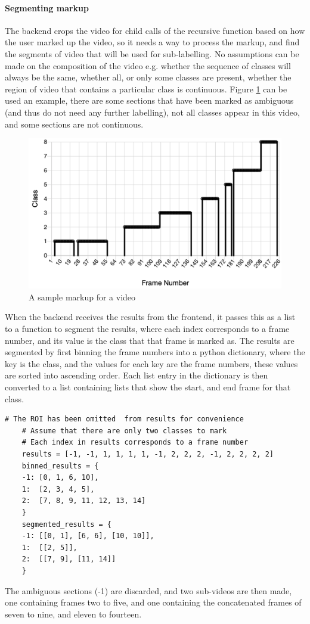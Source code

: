     \paragraph{Segmenting markup}
    The backend crops the video for child calls of the recursive function based on how the user marked up the video, so it needs a way to process the markup, and find the segments of video that will be used for sub-labelling. No assumptions can be made on the composition of the video e.g. whether the sequence of classes will always be the same, whether all, or only some classes are present, whether the region of video that contains a particular class is continuous. Figure \ref{fig:labelsample} can be used an example, there are some sections that have been marked as ambiguous (and thus do not need any further labelling), not all classes appear in this video, and some sections are not continuous.

    \begin{figure}[h]
        \centering
        \includegraphics[width=450px]{../img/sample_label.png}
        \caption{A sample markup for a video}
        \label{fig:labelsample}
    \end{figure}

    When the backend receives the results from the frontend, it passes this as a list to a function to segment the results, where each index corresponds to a frame number, and its value is the class that that frame is marked as. The results are segmented by first binning the frame numbers into a python dictionary, where the key is the class, and the values for each key are the frame numbers, these values are sorted into ascending order. Each list entry in the dictionary is then converted to a list containing lists that show the start, and end frame for that class.
    \begin{lstlisting}[style=PythonStyle]
    # The ROI has been omitted  from results for convenience
    # Assume that there are only two classes to mark
    # Each index in results corresponds to a frame number
    results = [-1, -1, 1, 1, 1, 1, -1, 2, 2, 2, -1, 2, 2, 2, 2]
    binned_results = {
    -1: [0, 1, 6, 10],
    1:  [2, 3, 4, 5],
    2:  [7, 8, 9, 11, 12, 13, 14]
    }
    segmented_results = {
    -1: [[0, 1], [6, 6], [10, 10]],
    1:  [[2, 5]],
    2:  [[7, 9], [11, 14]]
    }\end{lstlisting}
    The ambiguous sections (-1) are discarded, and two sub-videos are then made, one containing frames two to five, and one containing the concatenated frames of seven to nine, and eleven to fourteen.

